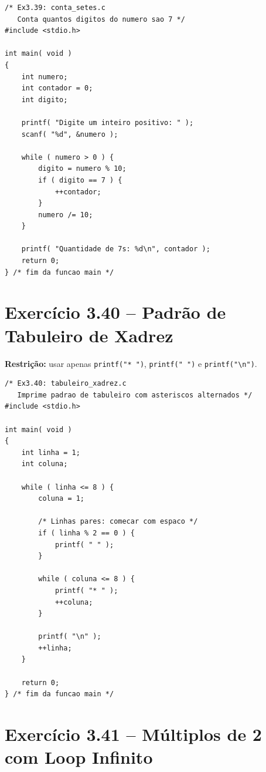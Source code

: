\documentclass[12pt,a4paper]{article}
\begin{document}
\begin{respostabox}
\begin{lstlisting}
/* Ex3.39: conta_setes.c
   Conta quantos digitos do numero sao 7 */
#include <stdio.h>

int main( void )
{
    int numero;
    int contador = 0;
    int digito;

    printf( "Digite um inteiro positivo: " );
    scanf( "%d", &numero );

    while ( numero > 0 ) {
        digito = numero % 10;
        if ( digito == 7 ) {
            ++contador;
        }
        numero /= 10;
    }

    printf( "Quantidade de 7s: %d\n", contador );
    return 0;
} /* fim da funcao main */
\end{lstlisting}
\end{respostabox}

\newpage

\section{Exercício 3.40 -- Padrão de Tabuleiro de Xadrez}

\begin{respostabox}
\textbf{Restrição:} usar apenas \texttt{printf("* ")}, \texttt{printf(" ")} e
\texttt{printf("\textbackslash n")}.

\begin{lstlisting}
/* Ex3.40: tabuleiro_xadrez.c
   Imprime padrao de tabuleiro com asteriscos alternados */
#include <stdio.h>

int main( void )
{
    int linha = 1;
    int coluna;

    while ( linha <= 8 ) {
        coluna = 1;

        /* Linhas pares: comecar com espaco */
        if ( linha % 2 == 0 ) {
            printf( " " );
        }

        while ( coluna <= 8 ) {
            printf( "* " );
            ++coluna;
        }

        printf( "\n" );
        ++linha;
    }

    return 0;
} /* fim da funcao main */
\end{lstlisting}
\end{respostabox}

\section{Exercício 3.41 -- Múltiplos de 2 com Loop Infinito}
\end{document}
